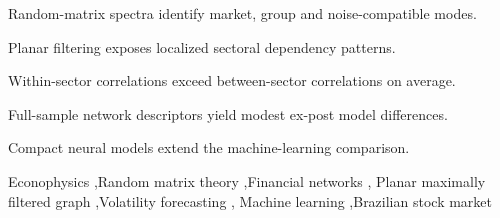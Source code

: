 \documentclass[a4paper,fleqn]{cas-sc}
\begin{document}
\begin{highlights}
\item Random-matrix spectra identify market, group and noise-compatible modes.
\item Planar filtering exposes localized sectoral dependency patterns.
\item Within-sector correlations exceed between-sector correlations on average.
\item Full-sample network descriptors yield modest ex-post model differences.
\item Compact neural models extend the machine-learning comparison.
\end{highlights}

\begin{keywords}
Econophysics \sep Random matrix theory \sep Financial networks \sep
Planar maximally filtered graph \sep Volatility forecasting \sep
Machine learning \sep Brazilian stock market
\end{keywords}

\maketitle















\appendix




\FloatBarrier

\printcredits



\end{document}
